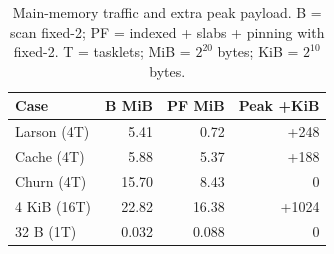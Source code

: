 \begin{table}[t]
\caption{Main-memory traffic and extra peak payload. B = scan fixed-2; PF = indexed + slabs + pinning with fixed-2. T = tasklets; MiB = $2^{20}$ bytes; KiB = $2^{10}$ bytes.}\label{tab:traffic}
\centering\small
\begin{tabular}{lrrr}\toprule
Case & B MiB & PF MiB & Peak +KiB \\ \midrule
Larson (4T) & 5.41 & 0.72 & +248 \\
Cache (4T) & 5.88 & 5.37 & +188 \\
Churn (4T) & 15.70 & 8.43 & 0 \\
4 KiB (16T) & 22.82 & 16.38 & +1024 \\
32 B (1T) & 0.032 & 0.088 & 0 \\
\bottomrule\end{tabular}
\par\vspace{2pt}{\footnotesize Peak is PF minus B; B in request sizes means bytes. The separate 64 KiB ownership map is excluded from payload peaks.}
\end{table}
